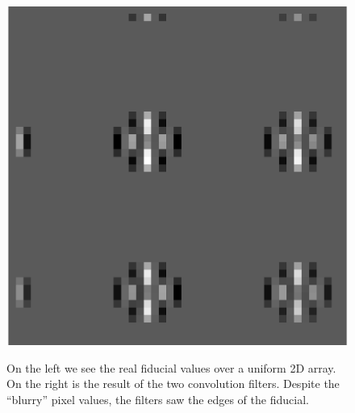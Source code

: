 \documentclass[10pt]{article}
\begin{document}
\begin{figure}[!ht]
{            \includegraphics[width=0.98\linewidth, height = .34\textheight, keepaspectratio=true]{plots_tables_images/whodunit.eps}
        }    
        \caption{On the left we see the real fiducial values over a uniform 2D array. On the right is the result of the two convolution filters. Despite the ``blurry'' pixel values, the filters saw the edges of the fiducial.}
    \label{whodunit}
\end{figure}
\end{document}
